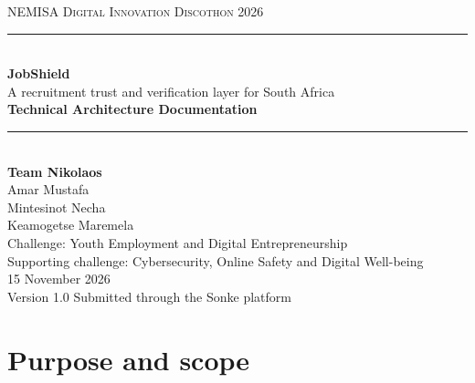 \documentclass[11pt,a4paper]{article}
\begin{document}
\begin{titlepage}
\thispagestyle{empty}
\centering
\vspace*{2.2cm}
{\large\textsc{NEMISA Digital Innovation Discothon 2026}}\\[0.5cm]
\rule{\textwidth}{0.8pt}\\[1.2cm]
{\fontsize{34}{40}\selectfont\bfseries JobShield}\\[0.5cm]
{\Large A recruitment trust and verification layer for South Africa}\\[1.4cm]
{\fontsize{20}{24}\selectfont\bfseries Technical Architecture Documentation}\\[1.2cm]
\rule{\textwidth}{0.8pt}\\[2.0cm]
{\large\textbf{Team Nikolaos}}\\[0.5cm]
{\large Amar Mustafa\\[2pt] Mintesinot Necha\\[2pt] Keamogetse Maremela}\\[2.2cm]
{\normalsize Challenge: Youth Employment and Digital Entrepreneurship\\[2pt]
Supporting challenge: Cybersecurity, Online Safety and Digital Well-being}\\[1.2cm]
{\normalsize 15 November 2026\\[2pt] Version 1.0}
\vfill
{\small Submitted through the Sonke platform}
\end{titlepage}

\setcounter{page}{2}
\setcounter{tocdepth}{2}
\renewcommand{\contentsname}{Table of Contents}
\tableofcontents
\clearpage

\setcounter{page}{1}

\section{Purpose and scope}
\noindent{}
\end{document}
